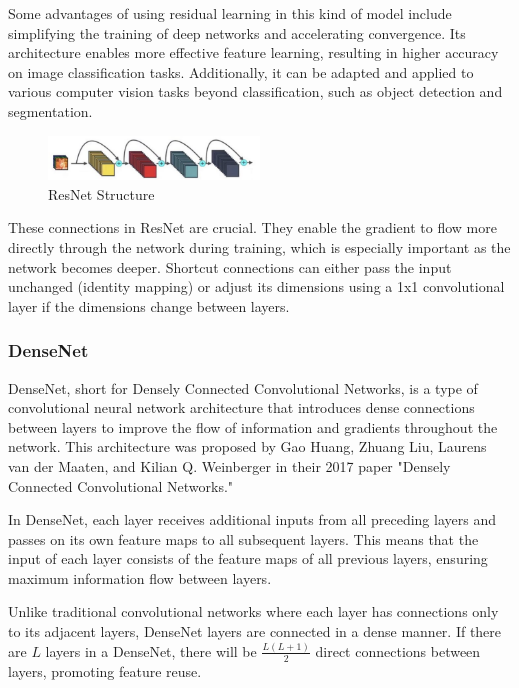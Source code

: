 \documentclass[conference]{IEEEtran}
\begin{document}
Some advantages of using residual learning in this kind of model include simplifying the training of deep networks and accelerating convergence. Its architecture enables more effective feature learning, resulting in higher accuracy on image classification tasks. Additionally, it can be adapted and applied to various computer vision tasks beyond classification, such as object detection and segmentation.

\begin{figure}[H]
\centering
    \includegraphics[width=0.5\textwidth]{images/ResNetStructure.png}
    \caption{ResNet Structure}
\end{figure}

These connections in ResNet are crucial. They enable the gradient to flow more directly through the network during training, which is especially important as the network becomes deeper. Shortcut connections can either pass the input unchanged (identity mapping) or adjust its dimensions using a 1x1 convolutional layer if the dimensions change between layers.

\subsubsection{DenseNet}

DenseNet, short for Densely Connected Convolutional Networks, is a type of convolutional neural network architecture that introduces dense connections between layers to improve the flow of information and gradients throughout the network. This architecture was proposed by Gao Huang, Zhuang Liu, Laurens van der Maaten, and Kilian Q. Weinberger in their 2017 paper "Densely Connected Convolutional Networks."

In DenseNet, each layer receives additional inputs from all preceding layers and passes on its own feature maps to all subsequent layers. This means that the input of each layer consists of the feature maps of all previous layers, ensuring maximum information flow between layers.

Unlike traditional convolutional networks where each layer has connections only to its adjacent layers, DenseNet layers are connected in a dense manner. If there are \( L \) layers in a DenseNet, there will be \( \frac{L(L+1)}{2} \) direct connections between layers, promoting feature reuse.
\end{document}
